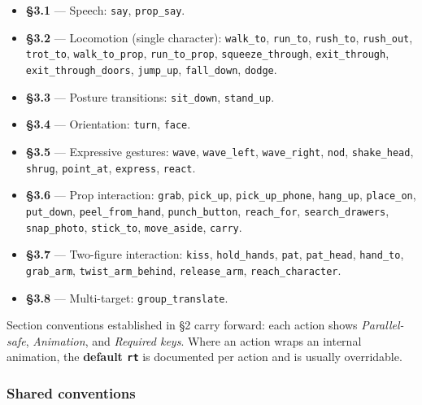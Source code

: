 \documentclass[
  12pt,
  letterpaper,
]{book}
\providecommand{\tightlist}{%
  \setlength{\itemsep}{0pt}\setlength{\parskip}{0pt}}
\begin{document}
\begin{itemize}
\tightlist
\item
  \textbf{§3.1} --- Speech: \texttt{say}, \texttt{prop\_say}.
\item
  \textbf{§3.2} --- Locomotion (single character): \texttt{walk\_to},
  \texttt{run\_to}, \texttt{rush\_to}, \texttt{rush\_out},
  \texttt{trot\_to}, \texttt{walk\_to\_prop}, \texttt{run\_to\_prop},
  \texttt{squeeze\_through}, \texttt{exit\_through},
  \texttt{exit\_through\_doors}, \texttt{jump\_up}, \texttt{fall\_down},
  \texttt{dodge}.
\item
  \textbf{§3.3} --- Posture transitions: \texttt{sit\_down},
  \texttt{stand\_up}.
\item
  \textbf{§3.4} --- Orientation: \texttt{turn}, \texttt{face}.
\item
  \textbf{§3.5} --- Expressive gestures: \texttt{wave},
  \texttt{wave\_left}, \texttt{wave\_right}, \texttt{nod},
  \texttt{shake\_head}, \texttt{shrug}, \texttt{point\_at},
  \texttt{express}, \texttt{react}.
\item
  \textbf{§3.6} --- Prop interaction: \texttt{grab}, \texttt{pick\_up},
  \texttt{pick\_up\_phone}, \texttt{hang\_up}, \texttt{place\_on},
  \texttt{put\_down}, \texttt{peel\_from\_hand}, \texttt{punch\_button},
  \texttt{reach\_for}, \texttt{search\_drawers}, \texttt{snap\_photo},
  \texttt{stick\_to}, \texttt{move\_aside}, \texttt{carry}.
\item
  \textbf{§3.7} --- Two-figure interaction: \texttt{kiss},
  \texttt{hold\_hands}, \texttt{pat}, \texttt{pat\_head},
  \texttt{hand\_to}, \texttt{grab\_arm}, \texttt{twist\_arm\_behind},
  \texttt{release\_arm}, \texttt{reach\_character}.
\item
  \textbf{§3.8} --- Multi-target: \texttt{group\_translate}.
\end{itemize}

Section conventions established in §2 carry forward: each action shows
\emph{Parallel-safe}, \emph{Animation}, and \emph{Required keys}. Where
an action wraps an internal animation, the \textbf{default \texttt{rt}}
is documented per action and is usually overridable.

\subsubsection{Shared conventions}\label{shared-conventions}
\end{document}
